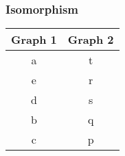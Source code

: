 \documentclass{beamer}
\begin{document}
\begin{frame}
\frametitle{Isomorphism}
\Large
\begin{center}
\begin{tabular}{|c|c|}
\hline Graph 1 & Graph 2 \\ \hline 
\hline a & t \\ \hline 
\hline e & r \\ \hline 
\hline d & s \\ \hline 
\hline b & q \\ \hline 
\hline c & p \\ 
\hline 
\end{tabular} 
\end{center}
\end{frame}
\end{document}
